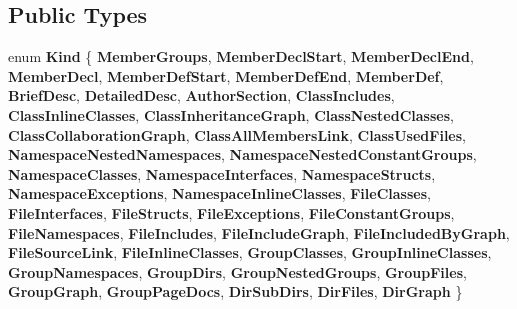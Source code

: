 \subsection*{Public Types}
\begin{DoxyCompactItemize}
\item 
\mbox{\label{struct_layout_doc_entry_a89dcbe762ed7e7f7790d8c034cf8ea01}} 
enum {\bfseries Kind} \{ \newline
{\bfseries Member\+Groups}, 
{\bfseries Member\+Decl\+Start}, 
{\bfseries Member\+Decl\+End}, 
{\bfseries Member\+Decl}, 
\newline
{\bfseries Member\+Def\+Start}, 
{\bfseries Member\+Def\+End}, 
{\bfseries Member\+Def}, 
{\bfseries Brief\+Desc}, 
\newline
{\bfseries Detailed\+Desc}, 
{\bfseries Author\+Section}, 
{\bfseries Class\+Includes}, 
{\bfseries Class\+Inline\+Classes}, 
\newline
{\bfseries Class\+Inheritance\+Graph}, 
{\bfseries Class\+Nested\+Classes}, 
{\bfseries Class\+Collaboration\+Graph}, 
{\bfseries Class\+All\+Members\+Link}, 
\newline
{\bfseries Class\+Used\+Files}, 
{\bfseries Namespace\+Nested\+Namespaces}, 
{\bfseries Namespace\+Nested\+Constant\+Groups}, 
{\bfseries Namespace\+Classes}, 
\newline
{\bfseries Namespace\+Interfaces}, 
{\bfseries Namespace\+Structs}, 
{\bfseries Namespace\+Exceptions}, 
{\bfseries Namespace\+Inline\+Classes}, 
\newline
{\bfseries File\+Classes}, 
{\bfseries File\+Interfaces}, 
{\bfseries File\+Structs}, 
{\bfseries File\+Exceptions}, 
\newline
{\bfseries File\+Constant\+Groups}, 
{\bfseries File\+Namespaces}, 
{\bfseries File\+Includes}, 
{\bfseries File\+Include\+Graph}, 
\newline
{\bfseries File\+Included\+By\+Graph}, 
{\bfseries File\+Source\+Link}, 
{\bfseries File\+Inline\+Classes}, 
{\bfseries Group\+Classes}, 
\newline
{\bfseries Group\+Inline\+Classes}, 
{\bfseries Group\+Namespaces}, 
{\bfseries Group\+Dirs}, 
{\bfseries Group\+Nested\+Groups}, 
\newline
{\bfseries Group\+Files}, 
{\bfseries Group\+Graph}, 
{\bfseries Group\+Page\+Docs}, 
{\bfseries Dir\+Sub\+Dirs}, 
\newline
{\bfseries Dir\+Files}, 
{\bfseries Dir\+Graph}
 \}
\end{DoxyCompactItemize}
